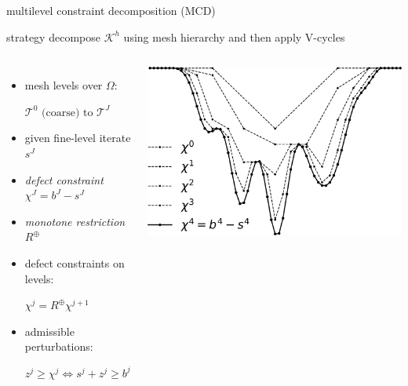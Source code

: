 \documentclass[usepdftitle=false,usenames,dvipsnames]{beamer}
\begin{document}
\begin{frame}{multilevel constraint decomposition (MCD)}

\begin{block}{strategy}
decompose $\mathcal{K}^h$ using mesh hierarchy and then apply V-cycles
\end{block}

\bigskip
\begin{columns}
\begin{itemize}
\item mesh levels over $\Omega$:

$\mathcal{T}^0 \text{ (coarse) to } \mathcal{T}^J$
\item given fine-level iterate $s^J$
\item \emph{defect constraint} $\chi^J = b^J - s^J$
\item \emph{monotone restriction} $R^\oplus$

\item defect constraints on levels:

$\chi^j = R^\oplus \chi^{j+1}$
\item admissible perturbations:

$z^j \ge \chi^j \iff s^j + z^j \ge b^j$
\end{itemize}
\includegraphics[width=1.05\textwidth]{figs/decompclassical.png}
\end{columns}
\end{frame}
\end{document}
